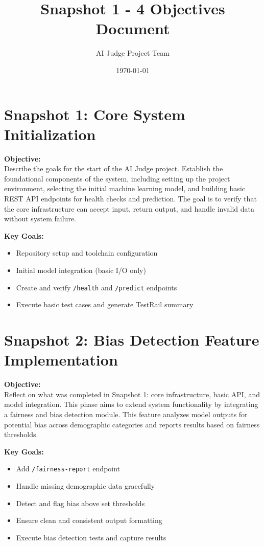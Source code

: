 \documentclass{article}
\title{Snapshot 1 - 4 Objectives Document}
\author{AI Judge Project Team}
\date{\today}
\begin{document}
\maketitle

\section*{Snapshot 1: Core System Initialization}

\textbf{Objective:} \\
Describe the goals for the start of the AI Judge project. Establish the foundational components of the system, including setting up the project environment, selecting the initial machine learning model, and building basic REST API endpoints for health checks and prediction. The goal is to verify that the core infrastructure can accept input, return output, and handle invalid data without system failure.

\textbf{Key Goals:}
\begin{itemize}
  \item Repository setup and toolchain configuration
  \item Initial model integration (basic I/O only)
  \item Create and verify \texttt{/health} and \texttt{/predict} endpoints
  \item Execute basic test cases and generate TestRail summary
\end{itemize}

\section*{Snapshot 2: Bias Detection Feature Implementation}

\textbf{Objective:} \\
Reflect on what was completed in Snapshot 1: core infrastructure, basic API, and model integration. This phase aims to extend system functionality by integrating a fairness and bias detection module. This feature analyzes model outputs for potential bias across demographic categories and reports results based on fairness thresholds.

\textbf{Key Goals:}
\begin{itemize}
  \item Add \texttt{/fairness-report} endpoint
  \item Handle missing demographic data gracefully
  \item Detect and flag bias above set thresholds
  \item Ensure clean and consistent output formatting
  \item Execute bias detection tests and capture results
\end{itemize}
\end{document}
